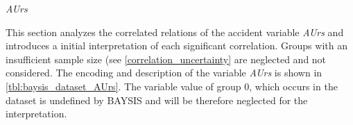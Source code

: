 \Large
\centerline{\textit{AUrs}}
\normalsize
This section analyzes the correlated relations of the accident variable \textit{AUrs} and introduces a initial interpretation of each significant correlation. Groups with an insufficient sample size (see \cref{correlation_uncertainty} are neglected and not considered. The encoding and description of the variable \textit{AUrs} is shown in \cref{tbl:baysis_dataset_AUrs}. The variable value of group 0, which occurs in the dataset is undefined by BAYSIS and will be therefore neglected for the interpretation.

